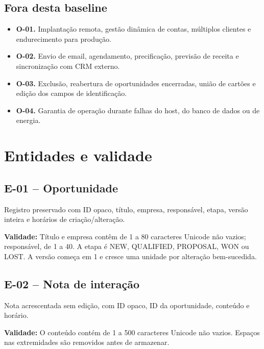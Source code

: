 \documentclass[10pt,a4paper]{article}
\begin{document}
\subsection{Fora desta baseline}

\begin{itemize}

\item \textbf{O-01.} Implantação remota, gestão dinâmica de contas, múltiplos clientes e endurecimento para produção.

\item \textbf{O-02.} Envio de email, agendamento, precificação, previsão de receita e sincronização com CRM externo.

\item \textbf{O-03.} Exclusão, reabertura de oportunidades encerradas, união de cartões e edição dos campos de identificação.

\item \textbf{O-04.} Garantia de operação durante falhas do host, do banco de dados ou de energia.

\end{itemize}

\section{Entidades e validade}

\subsection{E-01 -- Oportunidade}

Registro preservado com ID opaco, título, empresa, responsável, etapa, versão inteira e horários de criação/alteração.

\textbf{Validade:} Título e empresa contêm de 1 a 80 caracteres Unicode não vazios; responsável, de 1 a 40. A etapa é NEW, QUALIFIED, PROPOSAL, WON ou LOST. A versão começa em 1 e cresce uma unidade por alteração bem-sucedida.

\subsection{E-02 -- Nota de interação}

Nota acrescentada sem edição, com ID opaco, ID da oportunidade, conteúdo e horário.

\textbf{Validade:} O conteúdo contém de 1 a 500 caracteres Unicode não vazios. Espaços nas extremidades são removidos antes de armazenar.
\end{document}
